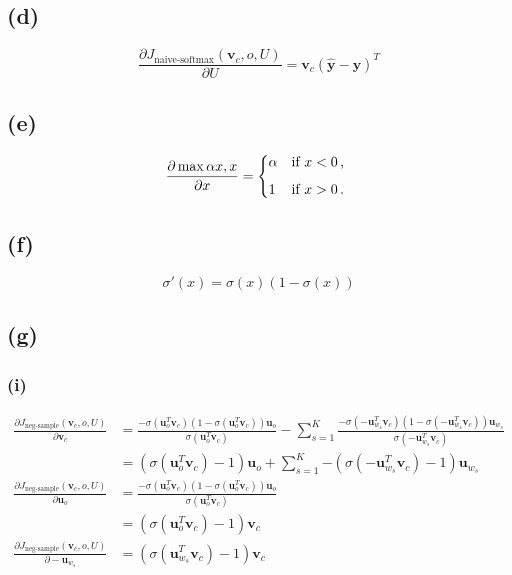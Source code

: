 \documentclass[12pt]{article}
\begin{document}
\subsection*{(d)}
\begin{equation*}
    \frac{\partial J_{\text{naive-softmax}}(\pmb{v}_c, o, U)}{\partial U} = \pmb{v}_c (\hat{\pmb{y}} - \pmb{y})^T
\end{equation*}

\subsection*{(e)}
\begin{equation*}
\frac{\partial \max{\alpha x, x}}{\partial x} =
\begin{dcases*}
\alpha & if $x < 0$\,, \\[1ex]
1 & if $x > 0$\,.
\end{dcases*}
\end{equation*}


\subsection*{(f)}
\begin{equation*}
    \sigma'(x) = \sigma(x)(1-\sigma(x))
\end{equation*}


\subsection*{(g)}

\subsubsection*{(i)}
\begin{align*}
    \frac{\partial J_{\text{neg-sample}}(\pmb{v}_c, o, U)}{\partial \pmb{v}_c} &= \frac{-\sigma(\pmb{u}_o^T \pmb{v}_c) (1 - \sigma(\pmb{u}_o^T \pmb{v}_c)) \pmb{u}_o}{\sigma(\pmb{u}_o^T \pmb{v}_c)} - \sum_{s=1}^K{\frac{-\sigma(-\pmb{u}_{w_s}^T \pmb{v}_c) (1 - \sigma(-\pmb{u}_{w_s}^T \pmb{v}_c)) \pmb{u}_{w_s}}{\sigma(-\pmb{u}_{w_s}^T \pmb{v}_c)}}\\
    &= (\sigma(\pmb{u}_o^T \pmb{v}_c) - 1) \pmb{u}_o + \sum_{s=1}^K{-(\sigma(-\pmb{u}_{w_s}^T \pmb{v}_c) - 1) \pmb{u}_{w_s}}\\
    \frac{\partial J_{\text{neg-sample}}(\pmb{v}_c, o, U)}{\partial \pmb{u}_o} &= \frac{-\sigma(\pmb{u}_o^T \pmb{v}_c) (1 - \sigma(\pmb{u}_o^T \pmb{v}_c)) \pmb{u}_o}{\sigma(\pmb{u}_o^T \pmb{v}_c)}\\
    &= (\sigma(\pmb{u}_o^T \pmb{v}_c) - 1) \pmb{v}_c\\
    \frac{\partial J_{\text{neg-sample}}(\pmb{v}_c, o, U)}{\partial -\pmb{u}_{w_s}} &= (\sigma(\pmb{u}_{w_s}^T \pmb{v}_c) - 1) \pmb{v}_c
\end{align*}
\end{document}
